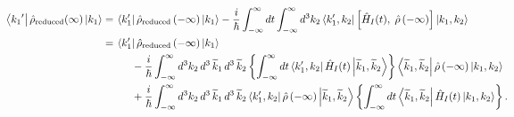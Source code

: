 \documentclass[11pt]{article}
\newcommand{\bra}[1]{\left\langle#1\right|}
\newcommand{\ket}[1]{\left|#1\right\rangle}
\newcommand{\op}[1]{\hat{#1}}
\theoremstyle{theorem}
\theoremstyle{remark}
\theoremstyle{step}
\theoremstyle{gap}
\begin{document}
\begin{align*}
\hspace{-5em}\bra{{k_1}^\prime}\op{\rho}_\text{reduced}(\infty)\ket{k_1} =\hspace{1.7em}&\hspace{-1.5em} \bra{k_1^\prime}\op{\rho}_\text{reduced}\left(-\infty\right)\ket{k_1} -  \frac{i}{\hbar} \int_{-\infty}^\infty dt \int_{-\infty}^\infty d^3k_2 \bra{k_1^\prime, k_2}\left[\op{H}_I(t),\; \op{\rho}\left(-\infty\right)\right]\ket{k_1, k_2} 
\\=\hspace{1.7em}&\hspace{-1.5em}
\bra{k_1^\prime}\op{\rho}_\text{reduced}\left(-\infty\right)\ket{k_1}
\\&-  \frac{i}{\hbar} \int_{-\infty}^\infty d^3k_2 \,d^3\,\widetilde{k}_1\,d^3\,\widetilde{k}_2 \left\{\int_{-\infty}^\infty dt \bra{k_1^\prime, k_2}\op{H}_I(t) \ket{\widetilde{k}_1, \widetilde{k}_2}
\right\}\bra{\widetilde{k}_1, \widetilde{k}_2}\op{\rho}\left(-\infty\right)\ket{k_1, k_2}
\\&+  \frac{i}{\hbar} \int_{-\infty}^\infty d^3k_2\,d^3\,\widetilde{k}_1\,d^3\,\widetilde{k}_2 \bra{k_1^\prime, k_2} \op{\rho}\left(-\infty\right)
\ket{\widetilde{k}_1, \widetilde{k}_2}\left\{\int_{-\infty}^\infty dt\bra{\widetilde{k}_1, \widetilde{k}_2}\op{H}_I(t)\ket{k_1, k_2}\right\}.
\end{align*}
\end{document}
